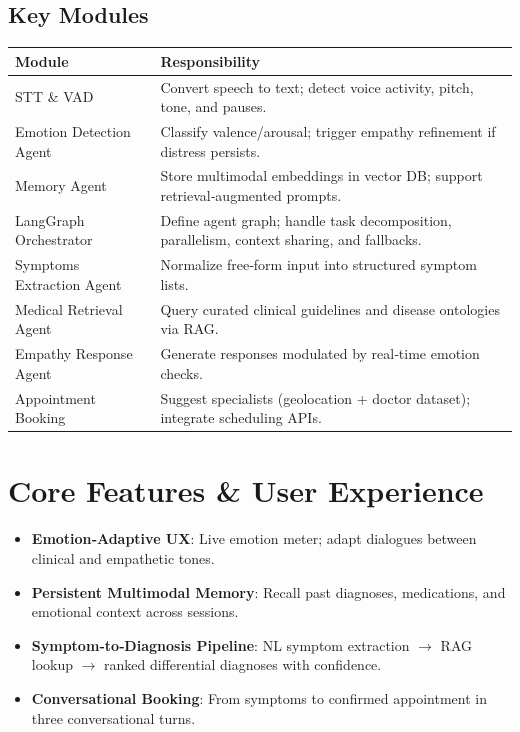 \documentclass[11pt,a4paper]{article}
\begin{document}
\subsection{Key Modules}
\begin{longtable}{@{}p{}p{}@{}}
\toprule
\textbf{Module} & \textbf{Responsibility} \\
\midrule
STT \& VAD & Convert speech to text; detect voice activity, pitch, tone, and pauses. \\
Emotion Detection Agent & Classify valence/arousal; trigger empathy refinement if distress persists. \\
Memory Agent & Store multimodal embeddings in vector DB; support retrieval‐augmented prompts. \\
LangGraph Orchestrator & Define agent graph; handle task decomposition, parallelism, context sharing, and fallbacks. \\
Symptoms Extraction Agent & Normalize free‐form input into structured symptom lists. \\
Medical Retrieval Agent & Query curated clinical guidelines and disease ontologies via RAG. \\
Empathy Response Agent & Generate responses modulated by real‐time emotion checks. \\
Appointment Booking & Suggest specialists (geolocation + doctor dataset); integrate scheduling APIs. \\
\bottomrule
\end{longtable}

\section{Core Features \& User Experience}
\begin{itemize}[left=0pt]
  \item \textbf{Emotion‐Adaptive UX}: Live emotion meter; adapt dialogues between clinical and empathetic tones.
  \item \textbf{Persistent Multimodal Memory}: Recall past diagnoses, medications, and emotional context across sessions.
  \item \textbf{Symptom‐to‐Diagnosis Pipeline}: NL symptom extraction $\to$ RAG lookup $\to$ ranked differential diagnoses with confidence.
  \item \textbf{Conversational Booking}: From symptoms to confirmed appointment in three conversational turns.
\end{itemize}
\end{document}
